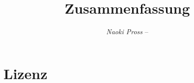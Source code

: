 \documentclass[twocolumn]{tex/hsrzf}
\author{\textsl{Naoki Pross} -- \texttt{\theauthoremail}}
\title{\texttt{\themodule} Zusammenfassung}
\date{\thesemester}
\begin{document}
\maketitle
\tableofcontents


\section{Lizenz}
\doclicenseThis
\end{document}
